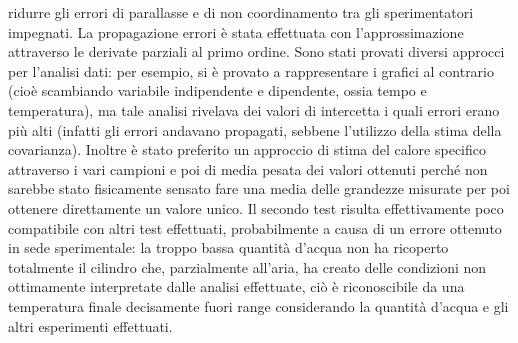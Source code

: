  ridurre gli errori di parallasse e di non coordinamento tra gli sperimentatori impegnati.
 La propagazione errori è stata effettuata con l'approssimazione attraverso le derivate parziali al primo ordine.
 Sono stati provati diversi approcci per l'analisi dati: per esempio, si è provato a rappresentare i grafici al
 contrario (cioè scambiando variabile indipendente e dipendente, ossia tempo e temperatura), ma tale analisi rivelava
 dei valori di intercetta i quali errori erano più alti (infatti gli errori andavano propagati, sebbene l'utilizzo
 della stima della covarianza). Inoltre è stato preferito un approccio di stima del calore specifico attraverso
 i vari campioni e poi di media pesata dei valori ottenuti perché non sarebbe stato fisicamente sensato fare una
 media delle grandezze misurate per poi ottenere direttamente un valore unico.
 Il secondo test risulta effettivamente poco compatibile con altri test effettuati, probabilmente a causa di un errore
 ottenuto in sede sperimentale: la troppo bassa quantità d'acqua non ha ricoperto totalmente il cilindro che,
 parzialmente all'aria, ha creato delle condizioni non ottimamente interpretate dalle analisi effettuate,
 ciò è riconoscibile da una temperatura finale decisamente fuori range considerando la quantità d'acqua e gli altri esperimenti 
 effettuati.
 
